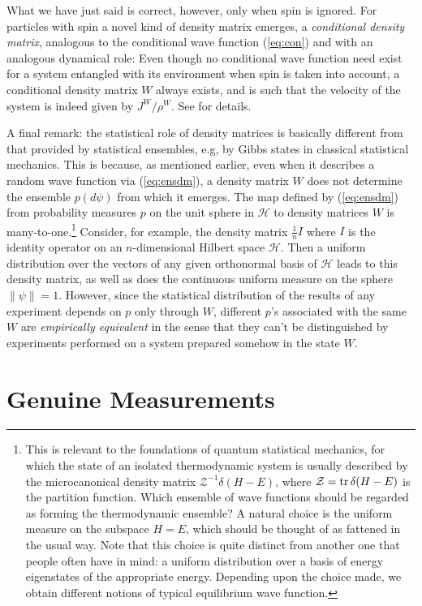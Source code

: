 \documentclass[12pt]{article}
\newcommand{\eq}[1]{(\ref{#1})}
\newcommand{\wf}{wave function}
\newcommand{\tr}{\mbox{${\rm tr}\,$}}
\newcommand{\id}{I}
\renewcommand{\H}{\mbox{$\mathcal{H}$}}
\begin{document}
What we have just said is correct, however, only when spin is ignored.
For particles with spin a novel kind of density matrix emerges, a {\em
   conditional density matrix}, analogous to the conditional wave
function \eq{eq:con} and with an analogous dynamical role: Even though
no conditional wave function need exist for a system entangled with
its environment when spin is taken into account, a conditional density
matrix $W$ always exists, and is such that the velocity of the system
is indeed given by $ J^W /\rho^W $. See \cite{Rodiden} for details.


A final remark: the statistical role of density matrices is basically
different {}from that provided by statistical ensembles, e.g, by Gibbs
states in classical statistical mechanics. This is because, as
mentioned earlier, even when it describes a random \wf{} via
\eq{eq:ensdm}, a density matrix $W$ does not determine the ensemble
$p(d\psi)$ {}from which it emerges. The map defined by
(\ref{eq:ensdm}) {}from probability measures $p$ on the unit sphere in
\H{} to density matrices $W$ is many-to-one.\footnote{This is relevant
   to the foundations of quantum statistical mechanics, for which the
   state of an isolated thermodynamic system is usually described by
   the microcanonical density matrix $\mathcal{Z}^{-1} \delta ( H-E)$,
   where $\mathcal{Z}=\tr \delta ( H-E)$ is the partition function.
   Which ensemble of \wf s should be regarded as forming the
   thermodynamic ensemble?  A natural choice is the uniform measure on
   the subspace $H=E$, which should be thought of as fattened in the
   usual way. Note that this choice is quite distinct {}from another
   one that people often have in mind: a uniform distribution over a
   basis of energy eigenstates of the appropriate energy.  Depending
   upon the choice made, we obtain different notions of typical
   equilibrium \wf{}.} Consider, for example, the density matrix
$\frac{1}{n} \id $ where $\id$ is the identity operator on an
$n$-dimensional Hilbert space \H{}.  Then a uniform distribution over
the vectors of any given orthonormal basis of \H{} leads to this
density matrix, as well as does the continuous uniform measure on the
sphere $\|\psi\|=1$.  However, since the statistical distribution of
the results of any experiment depends on $p$ only through $W$,
different $p$'s associated with the same $W$ are {\it empirically
   equivalent} in the sense that they can't be distinguished by
experiments performed on a system prepared somehow in the state $W$.


\section{Genuine Measurements}
\label{secMO}
\setcounter{equation}{0}
\end{document}
